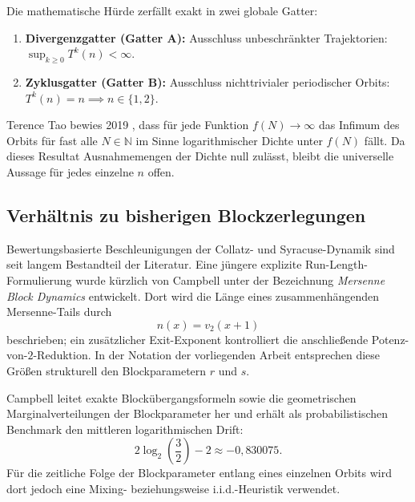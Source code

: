 \documentclass[11pt,reqno]{amsart}
\theoremstyle{definition}
\theoremstyle{remark}
\numberwithin{equation}{section}
\begin{document}
Die mathematische H\"urde zerfällt exakt in zwei globale Gatter:
\begin{enumerate}
\item \textbf{Divergenzgatter (Gatter A):} Ausschluss unbeschr\"ankter Trajektorien: $\sup_{k \ge 0} T^k(n) < \infty$.
\item \textbf{Zyklusgatter (Gatter B):} Ausschluss nichttrivialer periodischer Orbits: $T^k(n) = n \implies n \in \{1, 2\}$.
\end{enumerate}

Terence Tao bewies 2019 \cite{Tao2019}, dass f\"ur jede Funktion $f(N) \to \infty$ das Infimum des Orbits f\"ur fast alle $N \in \mathbb{N}$ im Sinne logarithmischer Dichte unter $f(N)$ f\"allt. Da dieses Resultat Ausnahmemengen der Dichte null zul\"asst, bleibt die universelle Aussage f\"ur jedes einzelne $n$ offen.

\subsection{Verh\"altnis zu bisherigen Blockzerlegungen}

Bewertungsbasierte Beschleunigungen der Collatz- und Syracuse-Dynamik sind seit langem Bestandteil der Literatur. Eine j\"ungere explizite Run-Length-Formulierung wurde k\"urzlich von Campbell \cite{Campbell2025} unter der Bezeichnung \emph{Mersenne Block Dynamics} entwickelt. Dort wird die L\"ange eines zusammenh\"angenden Mersenne-Tails durch
\begin{equation}
n(x) = v_2(x + 1)
\end{equation}
beschrieben; ein zus\"atzlicher Exit-Exponent kontrolliert die anschlie\ss{}ende Potenz-von-$2$-Reduktion. In der Notation der vorliegenden Arbeit entsprechen diese Gr\"o\ss{}en strukturell den Blockparametern $r$ und $s$.

Campbell leitet exakte Block\"ubergangsformeln sowie die geometrischen Marginalverteilungen der Blockparameter her und erh\"alt als probabilistischen Benchmark den mittleren logarithmischen Drift:
\begin{equation}
2\log_2\!\left(\frac{3}{2}\right) - 2 \approx -0{,}830075.
\end{equation}
F\"ur die zeitliche Folge der Blockparameter entlang eines einzelnen Orbits wird dort jedoch eine Mixing- beziehungsweise i.i.d.-Heuristik verwendet.
\end{document}
